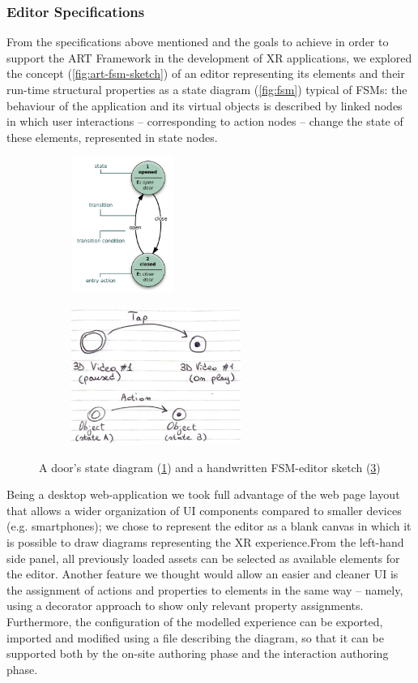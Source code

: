 \subsubsection*{Editor Specifications}
From the specifications above mentioned and the goals to achieve in order to support the ART Framework in the development of XR applications, we explored the concept (\autoref{fig:art-fsm-sketch}) of an editor representing its elements and their run-time structural properties as a state diagram (\autoref{fig:fsm}) typical of \glspl{FSM}: the behaviour of the application and its virtual objects is described by linked nodes in which user interactions -- corresponding to action nodes -- change the state of these elements, represented in state nodes.
\begin{figure}[h]
    \begin{subfigure}{0.45\columnwidth}
        \centering
        \includegraphics[height=12em]{Figures/Editor/fsm.png}
        \caption{}
        \label{fig:fsm}
    \end{subfigure}
    \begin{subfigure}{0.5\columnwidth}
        \centering
        \includegraphics[height=12em]{Figures/Editor/fsm-handwritten.png}
        \caption{}
        \label{fig:art-fsm-sketch}
    \end{subfigure}
    \caption{A door's state diagram (\ref{fig:fsm}) and a handwritten FSM-editor sketch (\ref{fig:art-fsm-sketch})}
\end{figure}

Being a desktop web-application we took full advantage of the web page layout that allows a wider organization of UI components compared to smaller devices (e.g. smartphones); we chose to represent the editor as a blank canvas in which it is possible to draw diagrams representing the XR experience.From the left-hand side panel, all previously loaded assets can be selected as available elements for the editor.
Another feature we thought would allow an easier and cleaner UI is the assignment of actions and properties to elements in the same way -- namely, using a decorator approach to show only relevant property assignments.
Furthermore, the configuration of the modelled experience can be exported, imported and modified using a file describing the diagram, so that it can be supported both by the on-site authoring phase and the interaction authoring phase.

